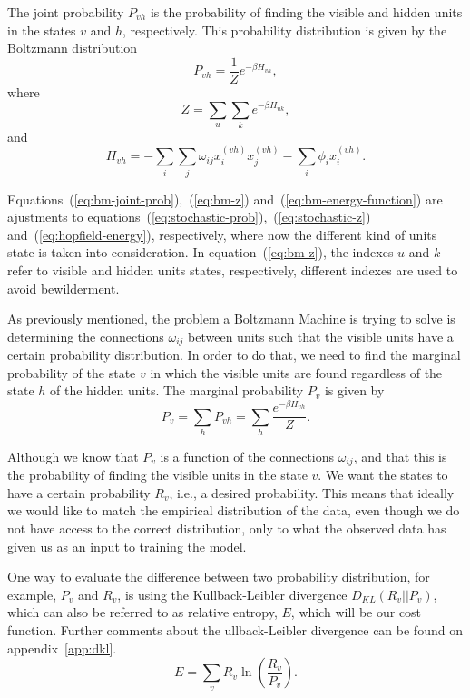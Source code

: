 The joint probability $P_{vh}$ is the probability of finding the visible and hidden units in the states $v$ and $h$, respectively.
This probability distribution is given by the Boltzmann distribution
\begin{equation}
  \label{eq:bm-joint-prob}
  P_{vh} = \frac{1}{Z}e^{-\beta H_{vh}},
\end{equation}
where
\begin{equation}
  \label{eq:bm-z}
  Z = \sum_{u} \sum_{k} e^{-\beta H_{uk}},
\end{equation}
and
\begin{equation}
  \label{eq:bm-energy-function}
  H_{vh} = - \sum_{i} \sum_{j} \omega_{ij} x^{(vh)}_{i} x^{(vh)}_{j} - \sum_{i} \phi_{i} x^{(vh)}_{i}.
\end{equation}

Equations~(\ref{eq:bm-joint-prob}),~(\ref{eq:bm-z}) and~(\ref{eq:bm-energy-function}) are ajustments to equations~(\ref{eq:stochastic-prob}),~(\ref{eq:stochastic-z}) and~(\ref{eq:hopfield-energy}), respectively, where now the different kind of units state is taken into consideration. 
In equation~(\ref{eq:bm-z}), the indexes $u$ and $k$ refer to visible and hidden units states, respectively, different indexes are used to avoid bewilderment.

As previously mentioned, the problem a Boltzmann Machine is trying to solve is determining the connections $\omega_{ij}$ between units such that the visible units have a certain probability distribution. 
In order to do that, we need to find the marginal probability of the state $v$ in which the visible units are found regardless of the state $h$ of the hidden units. The marginal probability $P_{v}$ is given by
\begin{equation}
  \label{eq:bm-marginal-prob}
  P_{v} = \sum_{h} P_{vh} = \sum_{h} \frac{e^{-\beta H_{vh}}}{Z}.
\end{equation}

Although we know that $P_{v}$ is a function of the connections $\omega_{ij}$, and that this is the probability of finding the visible units in the state $v$. We want the states to have a certain probability $R_{v}$, i.e., a desired probability.
This means that ideally we would like to match the empirical distribution of the data, even though we do not have access to the correct distribution, only to what the observed data has given us as an input to training the model.

One way to evaluate the difference between two probability distribution, for example, $P_{v}$ and $R_{v}$, is using the Kullback-Leibler divergence $D_{KL}(R_{v}||P_{v})$, which can also be referred to as relative entropy, $E$, which will be our cost function. 
Further comments about the ullback-Leibler divergence can be found on appendix~\ref{app:dkl}.
\begin{equation}
  \label{eq:relative-entropy}
  E = \sum_{v} R_{v} \ln{\left(\frac{R_{v}}{P_{v}}\right)}.
\end{equation}

